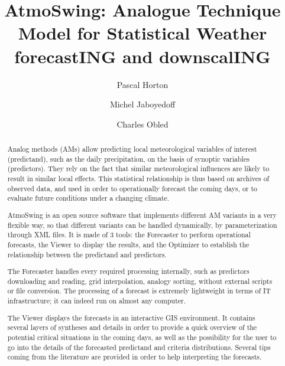 \documentclass[review]{elsarticle}
\begin{document}
\begin{frontmatter}

\title{AtmoSwing: Analogue Technique Model for Statistical Weather forecastING and downscalING}


\author[unibe,unil,terranum]{Pascal Horton}

\author[unil]{Michel Jaboyedoff}
\author[grenoble]{Charles Obled}

\address[unibe]{University of Bern, Oeschger Centre for Climate Change Research, Institute of Geography, Bern, Switzerland}
\address[unil]{University of Lausanne, Institute of Earth Sciences, Lausanne, Switzerland}
\address[terranum]{Terranum SARL, Bussigny, Switzerland}
\address[grenoble]{Universit\'{e} de Grenoble-Alpes, LTHE, Grenoble, France}



\begin{abstract}
Analog methods (AMs) allow predicting local meteorological variables of interest (predictand), such as the daily precipitation, on the basis of synoptic variables (predictors). They rely on the fact that similar meteorological influences are likely to result in similar local effects. This statistical relationship is thus based on archives of observed data, and used in order to operationally forecast the coming days, or to evaluate future conditions under a changing climate.

AtmoSwing is an open source software that implements different AM variants in a very flexible way, so that different variants can be handled dynamically, by parameterization through XML files. It is made of 3 tools: the Forecaster to perform operational forecasts, the Viewer to display the results, and the Optimizer to establish the relationship between the predictand and predictors. 

The Forecaster handles every required processing internally, such as predictors downloading and reading, grid interpolation, analogy sorting, without external scripts or file conversion. The processing of a forecast is extremely lightweight in terms of IT infrastructure; it can indeed run on almost any computer.

The Viewer displays the forecasts in an interactive GIS environment. It contains several layers of syntheses and details in order to provide a quick overview of the potential critical situations in the coming days, as well as the possibility for the user to go into the details of the forecasted predictand and criteria distributions. Several tips coming from the literature are provided in order to help interpreting the forecasts.


\end{abstract}
\end{frontmatter}
\end{document}
